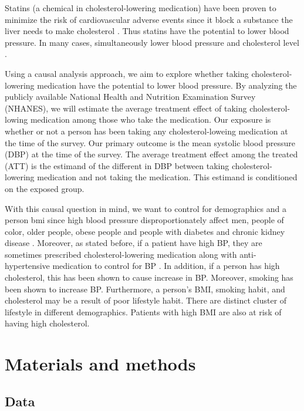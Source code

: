 \documentclass[useAMS,usenatbib,referee]{biom}
\begin{document}
Statins (a chemical in cholesterol-lowering medication) have been proven
to minimize the risk of cardiovascular adverse events since it block a
substance the liver needs to make cholesterol \citep{liu_statins_2023}.
Thus statins have the potential to lower blood pressure. In many cases,
simultaneously lower blood pressure and cholesterol level
\citep{strazzullo_statins_2007}.

Using a causal analysis approach, we aim to explore whether taking
cholesterol-lowering medication have the potential to lower blood
pressure. By analyzing the publicly available National Health and
Nutrition Examination Survey (NHANES), we will estimate the average
treatment effect of taking cholesterol-lowing medication among those who
take the medication. Our exposure is whether or not a person has been
taking any cholesterol-loweing medication at the time of the survey. Our
primary outcome is the mean systolic blood pressure (DBP) at the time of
the survey. The average treatment effect among the treated (ATT) is the
estimand of the different in DBP between taking cholesterol-lowering
medication and not taking the medication. This estimand is conditioned
on the exposed group.

With this causal question in mind, we want to control for demographics
and a person bmi since high blood pressure disproportionately affect
men, people of color, older people, obese people and people with
diabetes and chronic kidney disease \citep{chobufo_prevalence_2020}.
Moreover, as stated before, if a patient have high BP, they are
sometimes prescribed cholesterol-lowering medication along with
anti-hypertensive medication to control for BP \citep{egan_blood_2013}.
In addition, if a person has high cholesterol, this has been shown to
cause increase in BP. Moreover, smoking has been shown to increase BP.
Furthermore, a person's BMI, smoking habit, and cholesterol may be a
result of poor lifestyle habit. There are distinct cluster of lifestyle
in different demographics. Patients with high BMI are also at risk of
having high cholesterol.

\hypertarget{methods}{%
\section{Materials and methods}\label{methods}}

\hypertarget{data}{%
\subsection{Data}\label{data}}
\end{document}
